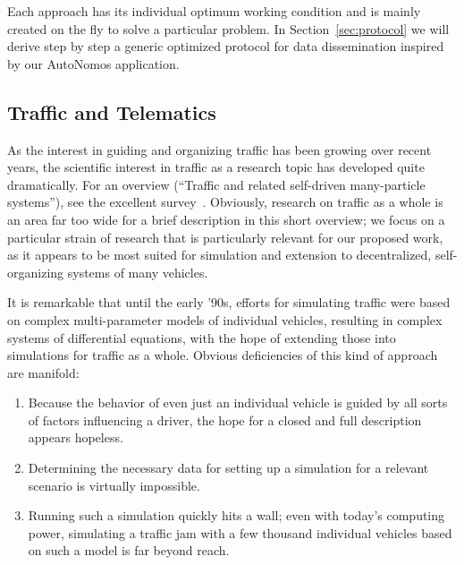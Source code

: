 \documentclass{acmrip}
\begin{document}
Each approach has its individual optimum working condition and is
mainly created on the fly to solve a particular problem. In
Section~\ref{sec:protocol} we will derive step by step a generic
optimized protocol for data dissemination inspired by our AutoNomos
application.

\subsection{Traffic and Telematics}

As the interest in guiding and organizing traffic has been growing
over recent years, the scientific interest in traffic as a research
topic has developed quite dramatically. For an overview (``Traffic
and related self-driven many-particle systems''), see the excellent
survey~\cite{h-trsdmps-01}. Obviously, research on traffic as a
whole is an area far too wide for a brief description in this short
overview; we focus on a particular strain of research that is
particularly relevant for our proposed work, as it appears to be
most suited for simulation and extension to decentralized,
self-organizing systems of many vehicles.

It is remarkable that until the early '90s, efforts for simulating
traffic were based on complex multi-parameter models of individual
vehicles, resulting in complex systems of differential equations,
with the hope of extending those into simulations for traffic as a
whole. Obvious deficiencies of this kind of approach are manifold:

\begin{enumerate}
\item Because the behavior of even just an individual vehicle is guided
by all sorts of factors influencing a driver, the hope for a closed
and full description appears hopeless.

\item Determining the necessary data for setting up a simulation
for a relevant scenario is virtually impossible.

\item Running such a simulation quickly hits a wall; even with today's
computing power, simulating a traffic jam with a few thousand
individual vehicles based on such a model is far beyond reach.
\end{enumerate}
\end{document}

